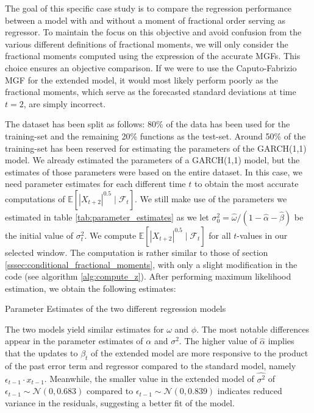 The goal of this specific case study is to compare the regression performance between a model with and without a moment of fractional order serving as regressor. To maintain the focus on this objective and avoid confusion from the various different definitions of fractional moments, we will only consider the fractional moments computed using the expression of the accurate MGFs. This choice ensures an objective comparison. If we were to use the Caputo-Fabrizio MGF for the extended model, it would most likely perform poorly as the fractional moments, which serve as the forecasted standard deviations at time \(t = 2\), are simply incorrect.
\newline

The dataset has been split as follows: 80\% of the data has been used for the training-set and the remaining 20\% functions as the test-set. Around 50\% of the training-set has been reserved for estimating the parameters of the GARCH(1,1) model. We already estimated the parameters of a GARCH(1,1) model, but the estimates of those parameters were based on the entire dataset. In this case, we need parameter estimates for each different time \(t\) to obtain the most accurate computations of \(\mathbb{E}[|X_{t + 2}|^{0.5} \mid \mathcal{F}_t]\). We still make use of the parameters we estimated in table \ref{tab:parameter_estimates} as we let \(\sigma^2_0 = \hat{\omega} / ( 1 - \hat{\alpha} - \hat{\beta})\) be the initial value of \(\sigma^2_t\). We compute \(\mathbb{E}[|X_{t + 2}|^{0.5} \mid \mathcal{F}_t]\) for all \(t\)-values in our selected window. The computation is rather similar to those of section \ref{sssec:conditional_fractional_moments}, with only a slight modification in the code (see algorithm \ref{alg:compute_z}).
After performing maximum likelihood estimation, we obtain the following estimates:
\begin{table}[H]
    \centering

\caption{Parameter Estimates of the two different regression models} 
\label{tab:observation_model}
\end{table}
The two models yield similar estimates for \(\omega\) and \(\phi\). 
The most notable differences appear in the parameter estimates of \(\alpha\) and \(\sigma^2\). The higher value of \(\hat{\alpha}\) implies that the updates to \(\beta_t\) of the extended model are more responsive to the product of the past error term and regressor compared to the standard model, namely \(\epsilon_{t -1} \cdot x_{t-1}\). Meanwhile, the smaller value in the extended model of \(\hat{\sigma^2}\) of \(\epsilon_{t-1} \sim \mathcal{N}(0, 0.683)\) compared to \(\epsilon_{t-1} \sim \mathcal{N}(0, 0.839)\) indicates reduced variance in the residuals, suggesting a better fit of the model. 

